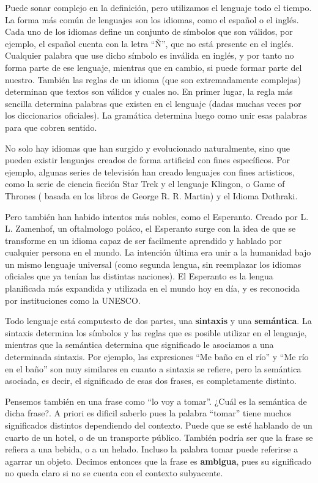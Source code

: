 Puede sonar complejo en la definición, pero utilizamos el lenguaje todo el tiempo.
La forma más común de lenguajes son los idiomas, como el español o el inglés.
Cada uno de los idiomas define un conjunto de símbolos que son válidos, por ejemplo,
el español cuenta con la letra ``Ñ'', que no está presente en el inglés. Cualquier
palabra que use dicho símbolo es inválida en inglés, y por tanto no forma parte de
ese lenguaje, mientras que en cambio, si puede formar parte del nuestro. También
las reglas de un idioma (que son extremadamente complejas) determinan que textos
son válidos y cuales no. En primer lugar, la regla más sencilla determina palabras
que existen en el lenguaje (dadas muchas veces por los diccionarios oficiales).
La gramática determina luego como unir esas palabras para que cobren sentido.

No solo hay idiomas que han surgido y evolucionado naturalmente, sino que pueden
existir lenguajes creados de forma artificial con fines específicos. Por ejemplo,
algunas series de televisión han creado lenguajes con fines artisticos, como la
serie de ciencia ficción Star Trek y el lenguaje Klingon, o Game of Thrones (
basada en los libros de George R. R. Martin) y el Idioma Dothraki.\autocite{littaur_2017}

Pero también han habido intentos más nobles, como el Esperanto. Creado por 
L. L. Zamenhof, un oftalmologo poláco, el Esperanto surge con la idea de que se
transforme en un idioma capaz de ser facilmente aprendido y hablado por cualquier
persona en el mundo. La intención última era unir a la humanidad bajo un mismo
lenguaje universal (como segunda lengua, sin reemplazar los idiomas oficiales
que ya tenían las distintas naciones). El Esperanto es la
lengua planificada más expandida y utilizada en el mundo hoy en día, y es
reconocida por instituciones como la UNESCO.

Todo lenguaje está computesto de dos partes, una \textbf{sintaxis} y una
\textbf{semántica}. La sintaxis determina los símbolos y las reglas que es posible
utilizar en el lenguaje, mientras que la semántica determina que significado le
asociamos a una determinada sintaxis. Por ejemplo, las expresiones ``Me baño en
el río'' y ``Me río en el baño'' son muy similares en cuanto a sintaxis se refiere,
pero la semántica asociada, es decir, el significado de esas dos frases, es completamente
distinto.

Pensemos también en una frase como ``lo voy a tomar''. ¿Cuál es la semántica de
dicha frase?. A priori es dificil saberlo pues la palabra ``tomar'' tiene
muchos significados distintos dependiendo del contexto. Puede que se esté hablando
de un cuarto de un hotel, o de un transporte público. También podría ser que la
frase se refiera a una bebida, o a un helado. Incluso la palabra tomar puede
referirse a agarrar un objeto. Decimos entonces que la frase es \textbf{ambigua},
pues su significado no queda claro si no se cuenta con el contexto subyacente.

